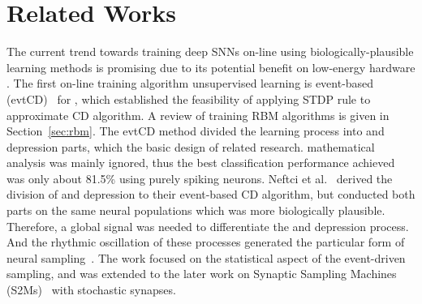 \section{Related Works}
\DIFaddbegin \label{sec:SRM_related}
\DIFaddend %
The current trend towards training deep SNNs on-line using biologically-plausible learning methods is promising due to its potential benefit on low-energy hardware \DIFdelbegin {}\DIFdelend \DIFaddbegin {}\DIFaddend .
The first on-line training algorithm \DIFdelbegin {}\DIFdelend \DIFaddbegin {}\DIFaddend unsupervised learning is event-based \DIFdelbegin {}\DIFdelend \DIFaddbegin {}\DIFaddend (evtCD)~\citep{neil2013online} for \DIFdelbegin {}\DIFdelend \DIFaddbegin {}\DIFaddend , which established the feasibility of applying \DIFaddbegin {}\DIFaddend STDP rule to \DIFaddbegin {}\DIFaddend approximate CD algorithm.
A review of training \DIFaddbegin {}\DIFaddend RBM algorithms is given in Section~\ref{sec:rbm}.
The evtCD method divided the learning process into \DIFdelbegin {}\DIFdelend \DIFaddbegin {}\DIFaddend and depression parts, which \DIFdelbegin {}\DIFdelend \DIFaddbegin {}\DIFaddend the basic design of related research.
\DIFdelbegin {}\DIFdelend \DIFaddbegin {}\DIFaddend mathematical analysis was mainly ignored, thus the best classification performance achieved was only about 81.5\% using purely spiking neurons.
Neftci et al.~\citep{neftci2013event} derived the division of \DIFdelbegin {}\DIFdelend \DIFaddbegin {}\DIFaddend and depression to their event-based CD algorithm, but conducted both parts on the same neural populations which was more biologically plausible.
Therefore, a global signal was needed to differentiate the \DIFdelbegin {}\DIFdelend \DIFaddbegin {}\DIFaddend and depression process.
And the rhythmic oscillation of these processes generated the particular form of neural sampling~\citep{petrovici2013stochastic}.
The work focused on the statistical aspect of the event-driven sampling, and was extended to the later work on Synaptic Sampling Machines (S2Ms)~\citep{neftci2016stochastic} with stochastic synapses.
